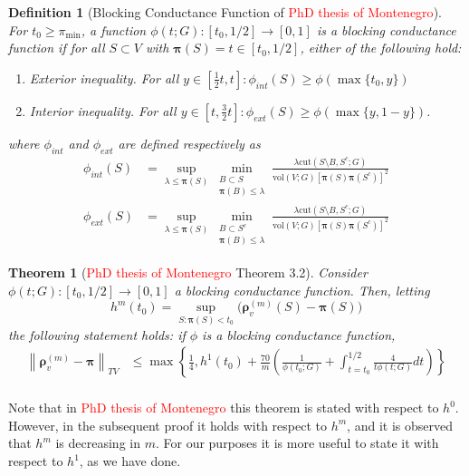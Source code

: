 \documentclass{article}
\newcommand{\vol}{\mathrm{vol}}
\newcommand{\norm}[1]{\left\lVert#1\right\rVert}
\newcommand{\1}{\mathbf{1}}
\newcommand{\cut}{\mathrm{cut}}
\newcommand{\pibf}{\bm{\pi}}
\newcommand{\rhobf}{\bm{\rho}}
\theoremstyle{aldenthm}
\newtheorem{theorem}{Theorem}
\newtheorem{definition}{Definition}
\begin{document}
\begin{definition}[Blocking Conductance Function of \textcolor{red}{PhD thesis of Montenegro}]
	\label{def: blocking_conductance_function}
	For $t_0 \geq \pi_{\min}$, a function $\phi(t; G): [t_0, 1/2] \to [0,1]$ is a \emph{blocking conductance function} if for all $S \subset V$ with $\pibf(S) = t \in [t_0, 1/2]$, either of the following hold: 
	\begin{enumerate}
		\item \emph{Exterior inequality.} For all $y \in \left[\frac{1}{2}t, t\right]: \phi_{int}(S) \geq \phi(\max\{t_0,y\})$
		\item \emph{Interior inequality.} For all $y  \in \left[t, \frac{3}{2}t\right]: \phi_{ext}(S) \geq \phi(\max\{y,1 - y\})$.
	\end{enumerate}
	where $\phi_{int}$ and $\phi_{ext}$ are defined respectively as
	\begin{align*}
	\phi_{int}(S) & = \sup_{\lambda \leq \pibf(S)} \min_{\substack{B \subset S \\ \pibf(B) \leq \lambda} } \frac{\lambda \cut(S \setminus B, S^c; G)}{\vol(V; G) \left[\pibf(S) \pibf(S^c)\right]^2} \\
	\phi_{ext}(S) & = \sup_{\lambda \leq \pibf(S)} \min_{\substack{B \subset S^c \\ \pibf(B) \leq \lambda} } \frac{\lambda \cut(S \setminus B, S^c; G)}{\vol(V; G) \left[\pibf(S) \pibf(S^c)\right]^2}
	\end{align*}
\end{definition}

\begin{theorem}[\textcolor{red}{PhD thesis of Montenegro} Theorem 3.2]
	\label{thm: montenegro}
	Consider $\phi(t; G): [t_0, 1/2] \to [0,1]$ a blocking conductance function. Then, letting
	\begin{equation*}
	h^m(t_0) = \sup_{S: \pibf(S) < t_0}  \bigl(\rhobf_v^{(m)}(S) - \pibf(S) \bigr)
	\end{equation*}
	the following statement holds: if $\phi$ is a blocking conductance function,
	\begin{align*}
	\norm{\rhobf_v^{(m)} - \pibf}_{TV} & \leq \max\left\{ \frac{1}{4}, h^1(t_0) +  \frac{70}{m}\left(\frac{1}{\phi(t_0; G)} + \int_{t = t_0}^{1/2} \frac{4}{t \phi(t; G)} dt\right) \right\} \\
	\end{align*}
\end{theorem}

Note that in \textcolor{red}{PhD thesis of Montenegro} this theorem is stated with respect to $h^0$. However, in the subsequent proof it holds with respect to $h^m$, and it is observed that $h^m$ is decreasing in $m$. For our purposes it is more useful to state it with respect to $h^1$, as we have done.
\end{document}
